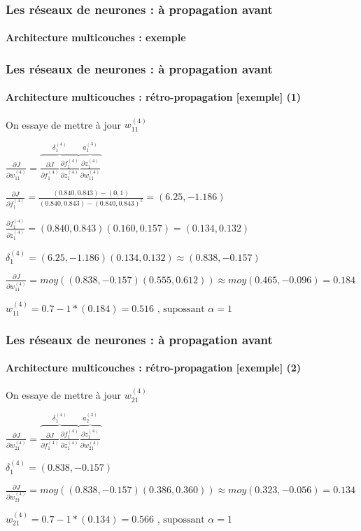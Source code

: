 \documentclass[xcolor=table]{beamer}
\begin{document}
\begin{frame}
\frametitle{Les réseaux de neurones : à propagation avant}
\framesubtitle{Architecture multicouches : exemple}


\end{frame}

\begin{frame}
\frametitle{Les réseaux de neurones : à propagation avant}
\framesubtitle{Architecture multicouches : rétro-propagation [exemple] (1)}

On essaye de mettre à jour $w_{11}^{(4)}$

$ 
\frac{\partial J}{\partial w_{11}^{(4)}} = \overbrace{\frac{\partial J}{\partial f_{1}^{(4)}} \frac{\partial f_{1}^{(4)}}{\partial z_{1}^{(4)}}}^{\delta_{1}^{(4)}} \overbrace{\frac{\partial z_{1}^{(4)}}{\partial w_{11}^{(4)}}}^{a_{1}^{(3)}}
$
 
$ 
\frac{\partial J}{\partial f_{1}^{(4)}} = \frac{(0.840, 0.843) - (0, 1)}{(0.840, 0.843) - (0.840, 0.843)^2} 
= (6.25, -1.186)
$

$ 
\frac{\partial f_{1}^{(4)}}{\partial z_{1}^{(4)}} = (0.840, 0.843) (0.160, 0.157) = (0.134, 0.132)
$

$
\delta_{1}^{(4)} = (6.25, -1.186) (0.134, 0.132) \approx (0.838, -0.157)
$

$
\frac{\partial J}{\partial w_{11}^{(4)}} = moy((0.838, -0.157) (0.555, 0.612)) 
\approx moy(0.465, -0.096) = 0.184
$

$
w_{11}^{(4)} = 0.7 - 1 * (0.184) = 0.516 \text{ , supossant } \alpha = 1
$

\end{frame}

\begin{frame}
\frametitle{Les réseaux de neurones : à propagation avant}
\framesubtitle{Architecture multicouches : rétro-propagation [exemple] (2)}

On essaye de mettre à jour $w_{21}^{(4)}$

$ 
\frac{\partial J}{\partial w_{21}^{(4)}} = \overbrace{\frac{\partial J}{\partial f_{1}^{(4)}} \frac{\partial f_{1}^{(4)}}{\partial z_{1}^{(4)}}}^{\delta_{1}^{(4)}} \overbrace{\frac{\partial z_{1}^{(4)}}{\partial w_{21}^{(4)}}}^{a_{2}^{(3)}}
$


$
\delta_{1}^{(4)} = (0.838, -0.157)
$

$
\frac{\partial J}{\partial w_{21}^{(4)}} = moy((0.838, -0.157) (0.386, 0.360)) 
\approx moy(0.323, -0.056) = 0.134
$

$
w_{21}^{(4)} = 0.7 - 1 * (0.134) = 0.566 \text{ , supossant } \alpha = 1
$

\end{frame}
\end{document}
